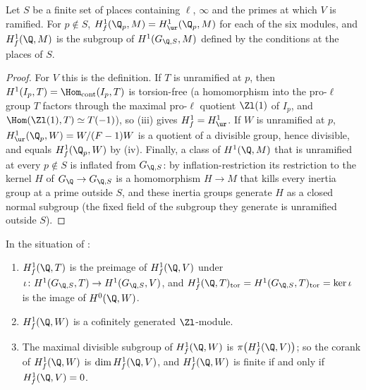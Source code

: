 \begin{lemma}\label{lem:blochkato:selmer-S}
Let $S$ be a finite set of places containing $\ell$, $\infty$ and the primes at which $V$ is ramified. For $p\notin S$, $H^1_f(\Q_p,M)=H^1_{\ur}(\Q_p,M)$ for each of the six
modules, and $H^1_f(\Q,M)$ is the subgroup of $H^1(G_{\Q,S},M)$ defined by the conditions at the places of $S$.
\end{lemma}

\begin{proof}
For $V$ this is the definition. If $T$ is unramified at $p$, then $H^1(I_p,T)=\Hom_{\mathrm{cont}}(I_p,T)$ is torsion-free (a homomorphism into the pro-$\ell$ group $T$ factors
through the maximal pro-$\ell$ quotient $\Zl(1)$ of $I_p$, and $\Hom(\Zl(1),T)\simeq T(-1)$), so (iii) gives $H^1_f=H^1_{\ur}$. If $W$ is
unramified at $p$, $H^1_{\ur}(\Q_p,W)=W/(F-1)W$ is a quotient of a divisible group, hence divisible, and equals $H^1_f(\Q_p,W)$ by
(iv). Finally, a class of $H^1(\Q,M)$ that is unramified at every $p\notin S$ is inflated from $G_{\Q,S}$: by inflation-restriction
its restriction to the kernel $H$ of $G_\Q\to G_{\Q,S}$ is a homomorphism $H\to M$ that kills every inertia group at a prime outside $S$, and these inertia groups
generate $H$ as a closed normal subgroup (the fixed field of the subgroup they generate is unramified outside $S$).
\end{proof}

\begin{proposition}[relations]\label{prop:blochkato:selmer-relations}
In the situation of :
\begin{enumerate}[label=(\roman*)]
\item \sloppy $H^1_f(\Q,T)$ is the preimage of $H^1_f(\Q,V)$ under $\iota\colon H^1(G_{\Q,S},T)\to H^1(G_{\Q,S},V)$, and $H^1_f(\Q,T)_{\mathrm{tor}}=H^1(G_{\Q,S},T)_{\mathrm{tor}}=\ker\iota$ is the
image of $H^0(\Q,W)$.
\item $H^1_f(\Q,W)$ is a cofinitely generated $\Zl$-module.
\item The maximal divisible subgroup of $H^1_f(\Q,W)$ is $\pi\bigl(H^1_f(\Q,V)\bigr)$; so the corank of $H^1_f(\Q,W)$ is $\dim H^1_f(\Q,V)$, and $H^1_f(\Q,W)$ is finite if
and only if $H^1_f(\Q,V)=0$.
\end{enumerate}
\end{proposition}

